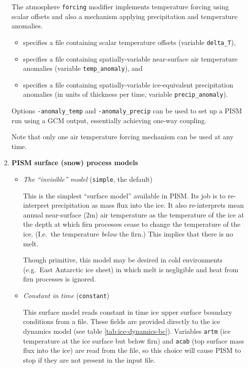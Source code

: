 \begin{enumerate}
  The atmosphere \texttt{forcing} modifier implements temperature forcing using scalar offsets and also a mechanism applying precipitation and temperature anomalies.
  \begin{itemize}
  \item {} specifies a file containing scalar temperature offsets (variable \texttt{delta_T}), 
  \item {} specifies a file containing spatially-variable near-surface air temperature anomalies (variable \texttt{temp_anomaly}), and
  \item {} specifies a file containing spatially-variable ice-equivalent precipitation anomalies (in units of thickness per time, variable \texttt{precip_anomaly}).
  \end{itemize}

  Options \texttt{-anomaly_temp} and \texttt{-anomaly_precip} can be used to set up a PISM run using a GCM output, essentially achieving one-way coupling.

  Note that only one air temperature forcing mechanism can be used at any time.  %

\item \textbf{PISM surface (snow) process models}

\begin{itemize}
  \item \emph{The ``invisible'' model} (\texttt{simple}, the default)

    This is the simplest ``surface model'' available in PISM.  Its job is to re-interpret  precipitation as mass flux into the ice.  It also re-interprets mean annual near-surface (2m) air temperature as the temperature of the ice at the depth at which firn processes cease to change the temperature of the ice.  (I.e.~the temperature \emph{below} the firn.)  This implies that there is no melt.

    Though primitive, this model may be desired in cold environments (e.g.~East Antarctic ice sheet) in which melt is negligible and heat from firn processes is ignored.

  \item \emph{Constant in time} (\texttt{constant})

    This surface model reads constant in time ice upper surface boundary conditions from a file.  These fields are provided directly to the ice dynamics model (see table \ref{tab:ice-dynamics-bc}).  Variables \texttt{artm} (ice temperature at the ice surface but below firn) and \texttt{acab} (top surface mass flux into the ice) are read from the file, so this choice will cause PISM to stop if they are not present in the input file.


\end{itemize}
\end{enumerate}
